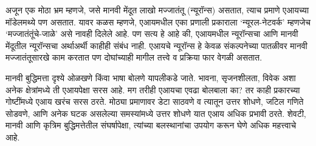 अजून एक मोठा भ्रम म्हणजे, जसे मानवी मेंदूत लाखो मज्जातंतू (न्यूरॉन्स) असतात, त्याच प्रमाणे एआयच्या मॉडेलमथ्ये पण असतात. यावर कळस म्हणजे, एआयमधील एका प्रणाली प्रकाराला `न्यूरल-नेटवर्क' म्हणजेच `मज्जातंतूंचे-जाळे' असे नावही दिलेले आहे. पण सत्य हे आहे की,  एआयमधील न्यूरॉन्सचा आणि मानवी मेंदूतील न्यूरॉन्सचा अर्थाअर्थी काहीही संबंध नाही. एआयचे न्यूरॉन्स हे केवळ संकल्पनेच्या पातळीवर मानवी मज्जातंतूसारखे काम करतात पण दोघांच्याही मागील तत्त्वे व प्रक्रिया फार वेगळी असतात. 

मानवी बुद्धिमत्ता दृश्ये ओळखणे किंवा भाषा बोलणे यापलीकडे जाते. भावना, सृजनशीलता, विवेक अशा अनेक क्षेत्रांमध्ये ती एआयपेक्षा सरस आहे. मग तरीही एआयचा एवढा बोलबाला का? तर काही प्रकारच्या गोष्टींमध्ये एआय खरंच सरस ठरते. मोठ्या प्रमाणावर डेटा साठवणे व त्यातून उत्तर शोधणे, जटिल गणिते सोडवणे, आणि अनेक घटक असलेल्या समस्यांमध्ये उत्तर शोधणे यात एआय अधिक प्रभावी ठरते. शेवटी, मानवी आणि कृत्रिम बुद्धिमत्तेतील संघर्षापेक्षा, त्यांच्या बलस्थानांचा उपयोग करून घेणे अधिक महत्त्वाचे आहे.




